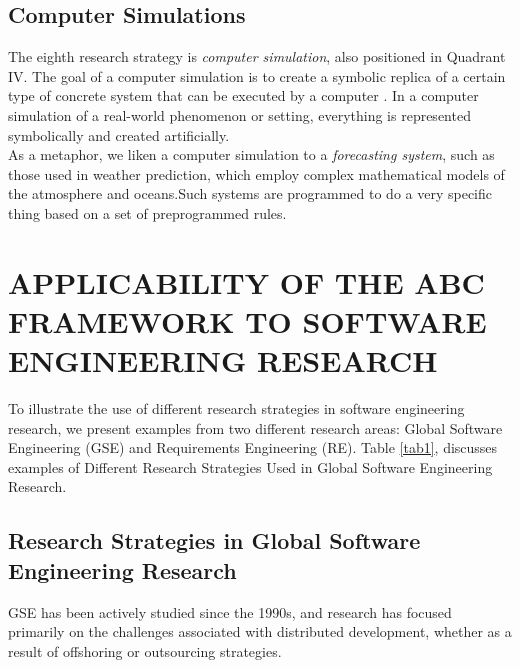 \documentclass[runningheads]{llncs}
\begin{document}
\subsection{Computer Simulations}
The eighth research strategy is \emph{computer simulation}, also positioned in Quadrant IV. The goal of a computer simulation is to create a symbolic replica of a certain type of concrete system that can be executed by a computer \cite{ref_article6}. In a computer simulation of a real-world phenomenon or setting, everything is represented symbolically and created artificially.
\\
As a metaphor, we liken a computer simulation to a \emph{forecasting system}, such as those used in weather prediction, which employ complex mathematical models of the atmosphere and oceans.Such systems are programmed to do a very specific thing based on a set of preprogrammed rules.

\section{APPLICABILITY OF THE ABC FRAMEWORK TO SOFTWARE
ENGINEERING RESEARCH}
\label{section4}
To illustrate the use of different research strategies in software engineering research, we present examples from two different research areas: Global Software Engineering (GSE) and Requirements Engineering (RE). Table \ref{tab1}, discusses examples of Different Research Strategies Used in Global Software Engineering Research.

\subsection{Research Strategies in Global Software Engineering Research}
GSE has been actively studied since the 1990s, and research has focused primarily on the challenges associated with distributed development, whether as a result of offshoring or outsourcing strategies.
\end{document}
